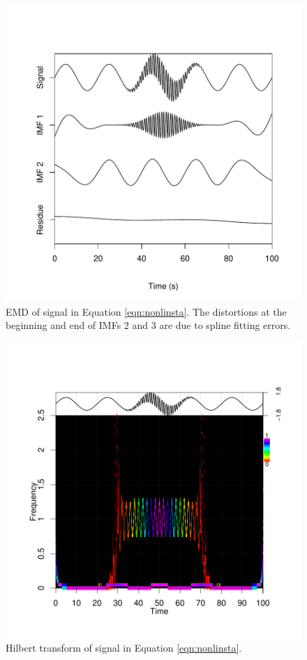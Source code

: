 \documentclass[12pt]{article}
\begin{document}
\begin{figure}[h]
\begin{center}
\includegraphics{interesting_signals-nonlinstaimfs}
\end{center}
\caption{EMD of signal in Equation \ref{eqn:nonlinsta}.
The distortions at the beginning and end of IMFs 2 and 3 are due to spline fitting errors.}
\label{fig:nonlinstaimfs}
\end{figure}

\begin{figure}[h]
\begin{center}
\includegraphics{interesting_signals-nonlinstaht}
\end{center}
\caption{Hilbert transform of signal in Equation \ref{eqn:nonlinsta}.}
\label{fig:nonlinstaht}
\end{figure}
\end{document}
